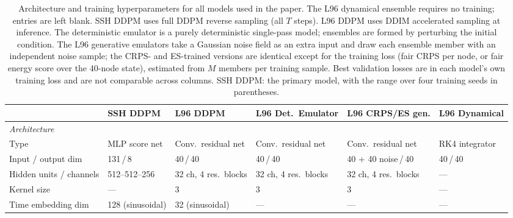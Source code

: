 %

\begin{table}[h]
\centering
\caption{%
  Architecture and training hyperparameters for all models used in the paper.
  The L96 dynamical ensemble requires no training; entries are left blank.
  SSH DDPM uses full DDPM reverse sampling (all $T$ steps).
  L96 DDPM uses DDIM accelerated sampling at inference.
  The deterministic emulator is a purely deterministic single-pass model;
  ensembles are formed by perturbing the initial condition.
  The L96 generative emulators take a Gaussian noise field as an extra input and
  draw each ensemble member with an independent noise sample; the CRPS- and
  ES-trained versions are identical except for the training loss (fair CRPS per
  node, or fair energy score over the 40-node state), estimated from $M$ members
  per training sample. Best validation losses are in each model's own training
  loss and are not comparable across columns. SSH DDPM: the primary model, with
  the range over four training seeds in parentheses.
}
\label{tab:model_config}
\setlength{\tabcolsep}{3pt}
\footnotesize
\begin{adjustbox}{max width=\textwidth}
\begin{tabular}{llllll}
\toprule
 & \textbf{SSH DDPM} & \textbf{L96 DDPM} & \textbf{L96 Det.\ Emulator} & \textbf{L96 CRPS/ES gen.} & \textbf{L96 Dynamical} \\
\midrule
\multicolumn{6}{l}{\textit{Architecture}} \\
\quad Type                    & MLP score net      & Conv.\ residual net   & Conv.\ residual net   & Conv.\ residual net   & RK4 integrator \\
\quad Input / output dim      & 131\,/\,8          & 40\,/\,40             & 40\,/\,40             & 40 + 40 noise\,/\,40  & 40\,/\,40      \\
\quad Hidden units / channels & 512--512--256      & 32 ch, 4 res.\ blocks & 32 ch, 4 res.\ blocks & 32 ch, 4 res.\ blocks & ---            \\
\quad Kernel size             & ---                & 3                     & 3                     & 3                     & ---            \\
\quad Time embedding dim      & 128 (sinusoidal)   & 32 (sinusoidal)       & ---                   & ---                   & ---            \\

\end{tabular}
\end{adjustbox}
\end{table}
